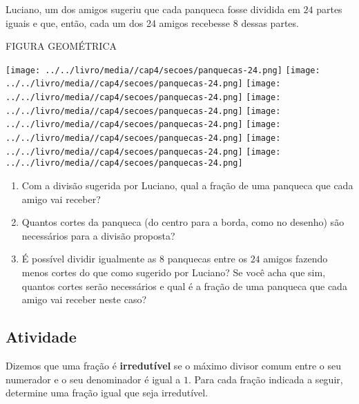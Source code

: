 \documentclass[a4,12pt]{book}
\begin{document}
Luciano, um dos amigos sugeriu que cada panqueca fosse dividida em $24$ partes iguais e que, então, cada um dos 24 amigos recebesse $8$ dessas partes.
\begin{imagem*}[breakable]{}{}   FIGURA GEOMÉTRICA  
  
    \texttt{[image: ../../livro/media//cap4/secoes/panquecas-24.png]}  
    \texttt{[image: ../../livro/media//cap4/secoes/panquecas-24.png]}  
    \texttt{[image: ../../livro/media//cap4/secoes/panquecas-24.png]}  
    \texttt{[image: ../../livro/media//cap4/secoes/panquecas-24.png]}  
    \texttt{[image: ../../livro/media//cap4/secoes/panquecas-24.png]}  
    \texttt{[image: ../../livro/media//cap4/secoes/panquecas-24.png]}  
    \texttt{[image: ../../livro/media//cap4/secoes/panquecas-24.png]}  
    \texttt{[image: ../../livro/media//cap4/secoes/panquecas-24.png]}  
\end{imagem*}

\begin{enumerate} [\quad I)] %
  \item     Com a divisão sugerida por Luciano, qual a fração de uma panqueca que cada amigo vai receber?
  \item     Quantos cortes da panqueca (do centro para a borda, como no desenho) são necessários para a divisão proposta?
  \item     É possível dividir igualmente as     $8$     panquecas entre os     $24$     amigos fazendo menos cortes do que como sugerido por Luciano? Se você acha que sim, quantos cortes serão necessários e qual é a fração de uma panqueca que cada amigo vai receber neste caso?
\end{enumerate} %







\subsection{Atividade}







Dizemos que uma fração é {\bf irredutível} se o máximo divisor comum entre o seu numerador e o seu denominador é igual a $1$. Para cada fração indicada a seguir, determine uma fração igual que seja irredutível.
\end{document}
